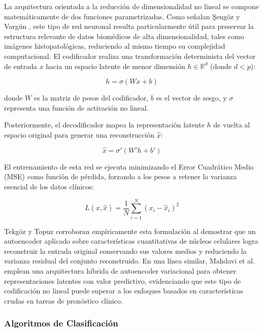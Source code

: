 \documentclass[journal]{IEEEtran}
\begin{document}
La arquitectura orientada a la reducción de dimensionalidad no lineal se compone matemáticamente de dos funciones parametrizadas. Como señalan Şengöz y Vargün \cite{engz2025}, este tipo de red neuronal resulta particularmente útil para preservar la estructura relevante de datos biomédicos de alta dimensionalidad, tales como imágenes histopatológicas, reduciendo al mismo tiempo su complejidad computacional. El codificador realiza una transformación determinista del vector de entrada $x$ hacia un espacio latente de menor dimensión $h \in \mathbb{R}^d$ (donde $d < p$):

\begin{equation}
h = \sigma(W x + b)
\end{equation}

donde $W$ es la matriz de pesos del codificador, $b$ es el vector de sesgo, y $\sigma$ representa una función de activación no lineal.

Posteriormente, el decodificador mapea la representación latente $h$ de vuelta al espacio original para generar una reconstrucción $\hat{x}$:

\begin{equation}
\hat{x} = \sigma'(W' h + b')
\end{equation}

El entrenamiento de esta red se ejecuta minimizando el Error Cuadrático Medio (MSE) como función de pérdida, forzando a los pesos a retener la varianza esencial de los datos clínicos:

\begin{equation}
L(x, \hat{x}) = \frac{1}{N} \sum_{i=1}^{N} (x_i - \hat{x}_i)^2
\end{equation}

Tekgöz y Topuz \cite{TEKGZ2025} corroboran empíricamente esta formulación al demostrar que un autoencoder aplicado sobre características cuantitativas de núcleos celulares logra reconstruir la entrada original conservando sus valores medios y reduciendo la varianza residual del conjunto reconstruido. En una línea similar, Mahdavi et al. \cite{Mahdavi2023} emplean una arquitectura híbrida de autoencoder variacional para obtener representaciones latentes con valor predictivo, evidenciando que este tipo de codificación no lineal puede superar a los enfoques basados en características crudas en tareas de pronóstico clínico.

\subsubsection{Algoritmos de Clasificación}
\end{document}
